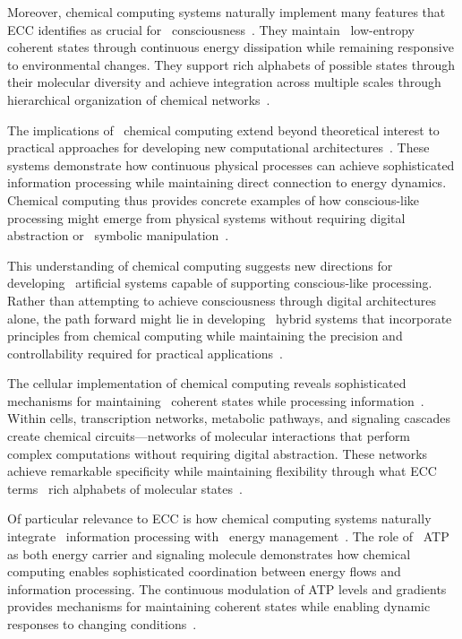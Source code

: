Moreover, chemical computing systems naturally implement many features that ECC identifies as crucial for~ consciousness~\cite{Magnasco1997,levin2020revisiting}. They maintain~ low-entropy coherent states through continuous energy dissipation while remaining responsive to environmental changes. They support rich alphabets of possible states through their molecular diversity and achieve integration across multiple scales through hierarchical organization of chemical networks~\cite{Prakash2007,kukushkin2024massed}.

The implications of~ chemical computing extend beyond theoretical interest to practical approaches for developing new computational architectures~\cite{Qian2011,Tanaka2021}. These systems demonstrate how continuous physical processes can achieve sophisticated information processing while maintaining direct connection to energy dynamics. Chemical computing thus provides concrete examples of how conscious-like processing might emerge from physical systems without requiring digital abstraction or~ symbolic manipulation~\cite{Soloveichik2010,butlin2023consciousnessartificialintelligenceinsights}.

This understanding of chemical computing suggests new directions for developing~ artificial systems capable of supporting conscious-like processing. Rather than attempting to achieve consciousness through digital architectures alone, the path forward might lie in developing~ hybrid systems that incorporate principles from chemical computing while maintaining the precision and controllability required for practical applications~\cite{Szacilowski2012,Wang2021}.

The cellular implementation of chemical computing reveals sophisticated mechanisms for maintaining~ coherent states while processing information~\cite{Dittrich2018,breakspear2005dynamics}. Within cells, transcription networks, metabolic pathways, and signaling cascades create chemical circuits—networks of molecular interactions that perform complex computations without requiring digital abstraction. These networks achieve remarkable specificity while maintaining flexibility through what ECC terms~ rich alphabets of molecular states~\cite{Benenson2019,bullmore2012economy}.

Of particular relevance to ECC is how chemical computing systems naturally integrate~ information processing with~ energy management~\cite{Katz2012,bejan2011constructal}. The role of~ ATP as both energy carrier and signaling molecule demonstrates how chemical computing enables sophisticated coordination between energy flows and information processing. The continuous modulation of ATP levels and gradients provides mechanisms for maintaining coherent states while enabling dynamic responses to changing conditions~\cite{Lehn2013,haier1988cortical}.

